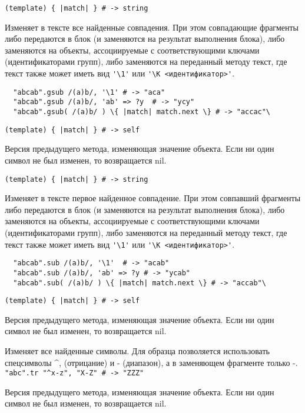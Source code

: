 \begin{methodlist}
  \verb!(template) { |match| } # -> string!

  Изменяет в тексте все найденные совпадения. При этом совпадающие фрагменты либо передаются в блок (и заменяются на результат выполнения блока), либо заменяются на объекты, ассоциируемые с соответствующими ключами (идентификаторами групп), либо заменяются на переданный методу текст, где текст также может иметь вид \verb!'\1'! или \verb!'\K <идентификатор>'!.
  \begin{verbatim}
  "abcab".gsub /(a)b/, '\1' # -> "aca"
  "abcab".gsub /(a)b/, 'ab' => ?y  # -> "ycy"
  "abcab".gsub( /(a)b/ ) \{ |match| match.next \} # -> "accac"\
  \end{verbatim}

  \verb!(template) { |match| } # -> self!

  Версия предыдущего метода, изменяющая значение объекта. Если ни один символ не был изменен, то возвращается nil.

  \verb!(template) { |match| } # -> string!

  Изменяет в тексте первое найденное совпадение. При этом совпавший фрагменты либо передаются в блок (и заменяются на результат выполнения блока), либо заменяются на объекты, ассоциируемые с соответствующими ключами (идентификаторами групп), либо заменяются на переданный методу текст, где текст также может иметь вид \verb!'\1'! или \verb!'\K <идентификатор>'!.
  \begin{verbatim}
  "abcab".sub /(a)b/, '\1'  # -> "acab"
  "abcab".sub /(a)b/, 'ab' => ?y # -> "ycab"
  "abcab".sub( /(a)b/ ) \{ |match| match.next \} # -> "accab"\
  \end{verbatim}

  \verb!(template) { |match| } # -> self!

  Версия предыдущего метода, изменяющая значение объекта. Если ни один символ не был изменен, то возвращается nil.

  \declare{.tr( template, replace )}{\# -> string}
  Изменяет все найденные символы. Для образца позволяется использовать спецсимволы \textasciicircum\-, (отрицание) и - (диапазон), а в заменяющем фрагменте только -.
  \\\verb!"abc".tr "^x-z", "X-Z" # -> "ZZZ"!

  Версия предыдущего метода, изменяющая значение объекта. Если ни один символ не был изменен, то возвращается nil.


\end{methodlist}
